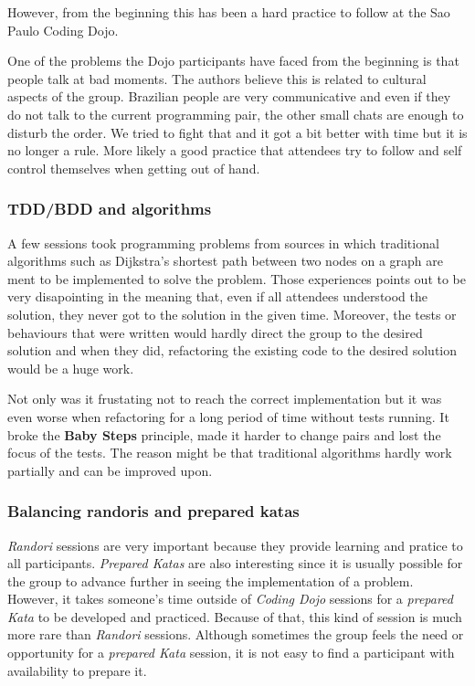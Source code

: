 However, from the beginning this has been a hard practice to follow at
the Sao Paulo Coding Dojo.

One of the problems the Dojo participants have faced from the
beginning is that people talk at bad moments. The authors believe this
is related to cultural aspects of the group. Brazilian people are very
communicative and even if they do not talk to the current programming
pair, the other small chats are enough to disturb the order. We tried
to fight that and it got a bit better with time but it is no longer a
rule. More likely a good practice that attendees try to follow and
self control themselves when getting out of hand.

\subsubsection{TDD/BDD and algorithms}

A few sessions took programming problems from sources in which
traditional algorithms such as Dijkstra's shortest path between two
nodes on a graph are ment to be implemented to solve the
problem. Those experiences points out to be very disapointing in the
meaning that, even if all attendees understood the solution, they
never got to the solution in the given time. Moreover, the tests or
behaviours that were written would hardly direct the group to the
desired solution and when they did, refactoring the existing code to
the desired solution would be a huge work.

Not only was it frustating not to reach the correct implementation but
it was even worse when refactoring for a long period of time without
tests running. It broke the \textbf{Baby Steps} principle, made it
harder to change pairs and lost the focus of the tests. The reason
might be that traditional algorithms hardly work partially and can be
improved upon.

\subsubsection{Balancing randoris and prepared katas}

\textsl{Randori} sessions are very important because they provide
learning and pratice to all participants. \textsl{Prepared Katas} are
also interesting since it is usually possible for the group to advance
further in seeing the implementation of a problem. However, it takes
someone's time outside of \textsl{Coding Dojo} sessions for a
\textsl{prepared Kata} to be developed and practiced. Because of that,
this kind of session is much more rare than \textsl{Randori} sessions.
Although sometimes the group feels the need or opportunity for a
\textsl{prepared Kata} session, it is not easy to find a participant
with availability to prepare it.

